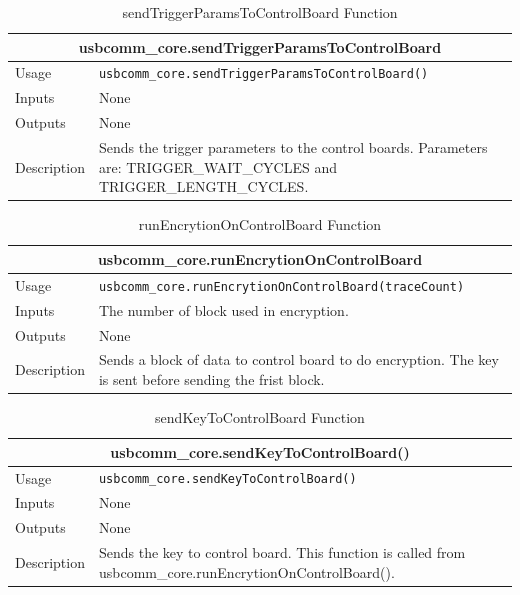 \documentclass{llncs}
\numberwithin{algorithm}{chapter}
\begin{document}
\begin{table}[H]
\caption{sendTriggerParamsToControlBoard Function}
\begin{tabular}{ |p{2cm}||p{11cm}|  }
 \hline
 \multicolumn{2}{|c|}{\cellcolor{teal}\textbf{usbcomm\_core.sendTriggerParamsToControlBoard}} \\
 \hline
 Usage & \texttt{usbcomm\_core.sendTriggerParamsToControlBoard()}\\ \hline
 Inputs & None \\ \hline
 Outputs &  None \\ \hline
 Description & Sends the trigger parameters to the control boards. Parameters are: TRIGGER\_WAIT\_CYCLES and TRIGGER\_LENGTH\_CYCLES. \\ \hline
\end{tabular}
\end{table}

\begin{table}[H]
\caption{runEncrytionOnControlBoard Function}
\begin{tabular}{ |p{2cm}||p{11cm}|  }
 \hline
 \multicolumn{2}{|c|}{\cellcolor{teal}\textbf{usbcomm\_core.runEncrytionOnControlBoard}} \\
 \hline
 Usage & \texttt{usbcomm\_core.runEncrytionOnControlBoard(traceCount)}\\ \hline
 Inputs & The number of block used in encryption. \\ \hline
 Outputs &  None \\ \hline
 Description & Sends a block of data to control board to do encryption. 
 The key is sent before sending the frist block. \\ \hline
\end{tabular}
\end{table}


\begin{table}[H]
\caption{sendKeyToControlBoard Function}
\begin{tabular}{ |p{2cm}||p{11cm}|  }
 \hline
 \multicolumn{2}{|c|}{\cellcolor{teal}\textbf{usbcomm\_core.sendKeyToControlBoard()}} \\
 \hline
 Usage & \texttt{usbcomm\_core.sendKeyToControlBoard()}\\ \hline
 Inputs & None \\ \hline
 Outputs &  None \\ \hline
 Description & Sends the key to control board. 
 This function is called from usbcomm\_core.runEncrytionOnControlBoard().\\ \hline
\end{tabular}
\end{table}
\end{document}
